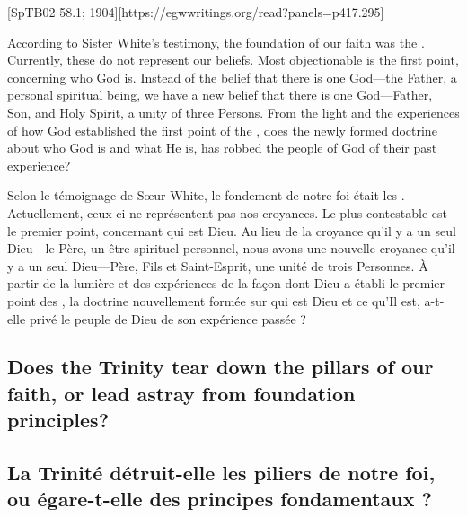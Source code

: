 [SpTB02 58.1; 1904][https://egwwritings.org/read?panels=p417.295]


According to Sister White’s testimony, the foundation of our faith was the . Currently, these do not represent our beliefs. Most objectionable is the first point, concerning who God is. Instead of the belief that there is one God—the Father, a personal spiritual being, we have a new belief that there is one God—Father, Son, and Holy Spirit, a unity of three Persons. From the light and the experiences of how God established the first point of the , does the newly formed doctrine about who God is and what He is, has robbed the people of God of their past experience?


Selon le témoignage de Sœur White, le fondement de notre foi était les . Actuellement, ceux-ci ne représentent pas nos croyances. Le plus contestable est le premier point, concernant qui est Dieu. Au lieu de la croyance qu'il y a un seul Dieu—le Père, un être spirituel personnel, nous avons une nouvelle croyance qu'il y a un seul Dieu—Père, Fils et Saint-Esprit, une unité de trois Personnes. À partir de la lumière et des expériences de la façon dont Dieu a établi le premier point des , la doctrine nouvellement formée sur qui est Dieu et ce qu'Il est, a-t-elle privé le peuple de Dieu de son expérience passée ?


\subsection*{Does the Trinity tear down the pillars of our faith, or lead astray from foundation principles?}


\subsection*{La Trinité détruit-elle les piliers de notre foi, ou égare-t-elle des principes fondamentaux ?}


